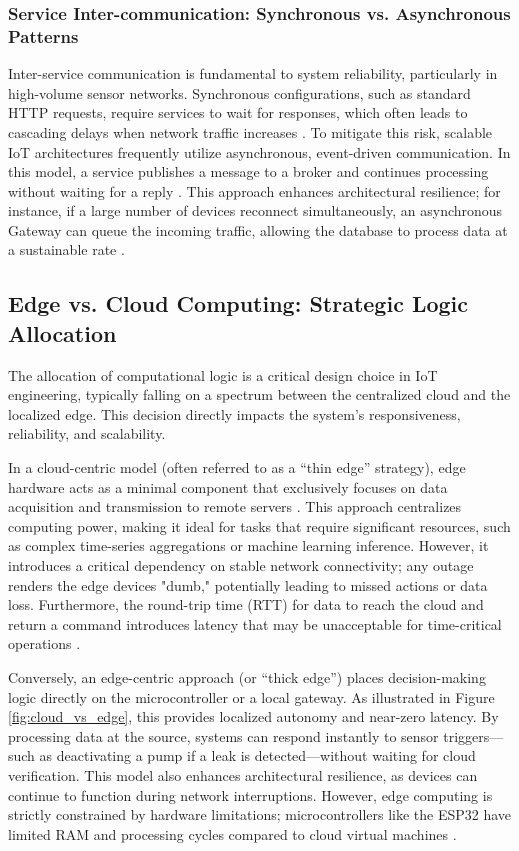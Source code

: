 \subsubsection{Service Inter-communication: Synchronous vs. Asynchronous Patterns}
Inter-service communication is fundamental to system reliability, particularly in high-volume sensor networks. Synchronous configurations, such as standard HTTP requests, require services to wait for responses, which often leads to cascading delays when network traffic increases \cite{gfg_microservices_communication}. To mitigate this risk, scalable IoT architectures frequently utilize asynchronous, event-driven communication. In this model, a service publishes a message to a broker and continues processing without waiting for a reply \cite{gfg_sync_vs_async_system_design}. This approach enhances architectural resilience; for instance, if a large number of devices reconnect simultaneously, an asynchronous Gateway can queue the incoming traffic, allowing the database to process data at a sustainable rate \cite{cerbos_inter_service_communication}.

\newpage
\subsection{Edge vs. Cloud Computing: Strategic Logic Allocation}
The allocation of computational logic is a critical design choice in IoT engineering, typically falling on a spectrum between the centralized cloud and the localized edge. This decision directly impacts the system's responsiveness, reliability, and scalability.

In a cloud-centric model (often referred to as a ``thin edge'' strategy), edge hardware acts as a minimal component that exclusively focuses on data acquisition and transmission to remote servers \cite{digitalocean_edge_vs_cloud, blog_elest_supabase_self_host}. This approach centralizes computing power, making it ideal for tasks that require significant resources, such as complex time-series aggregations or machine learning inference. However, it introduces a critical dependency on stable network connectivity; any outage renders the edge devices "dumb," potentially leading to missed actions or data loss. Furthermore, the round-trip time (RTT) for data to reach the cloud and return a command introduces latency that may be unacceptable for time-critical operations \cite{nsf_par_10184999, gfg_cloud_computing}.

Conversely, an edge-centric approach (or ``thick edge'') places decision-making logic directly on the microcontroller or a local gateway. As illustrated in Figure \ref{fig:cloud_vs_edge}, this provides localized autonomy and near-zero latency. By processing data at the source, systems can respond instantly to sensor triggers—such as deactivating a pump if a leak is detected—without waiting for cloud verification. This model also enhances architectural resilience, as devices can continue to function during network interruptions. However, edge computing is strictly constrained by hardware limitations; microcontrollers like the ESP32 have limited RAM and processing cycles compared to cloud virtual machines \cite{scalecomputing_edge_vs_cloud, scalecomputing_edge_devices}. 

